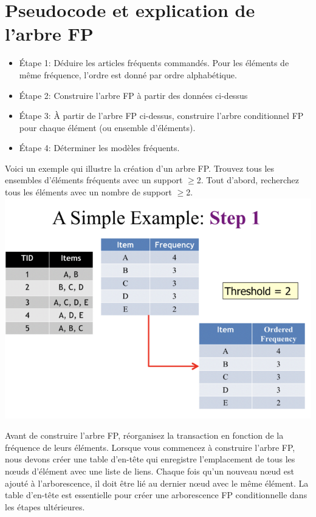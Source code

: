 \documentclass[a4paper,12pt]{article}
\begin{document}
\section{Pseudocode et explication de l'arbre FP}
\begin{itemize}
    \item Étape 1: Déduire les articles fréquents commandés. Pour les éléments de même fréquence, l'ordre est donné par ordre alphabétique.
    \item Étape 2: Construire l'arbre FP à partir des données ci-dessus
    \item Étape 3: À partir de l'arbre FP ci-dessus, construire l'arbre conditionnel FP pour chaque élément (ou ensemble d'éléments).
    \item Étape 4: Déterminer les modèles fréquents.
\end{itemize}
Voici un exemple qui illustre la création d’un arbre FP. Trouvez tous les ensembles d'éléments
fréquents avec un support  $\geq$2. Tout d'abord, recherchez tous les éléments avec un nombre de support $\geq$2.\\
\includegraphics[width=\textwidth]{one}
\pagebreak

Avant de construire l'arbre FP, réorganisez la transaction en fonction de la fréquence de leurs éléments. Lorsque vous commencez à construire l'arbre FP, nous devons créer une table d'en-tête qui enregistre l'emplacement de tous les nœuds d'élément avec une liste de liens. Chaque fois qu'un nouveau nœud est ajouté à l'arborescence, il doit être lié au dernier nœud avec le même élément. La table d'en-tête est essentielle pour créer une arborescence FP conditionnelle dans les étapes ultérieures.\\
    
\end{document}
